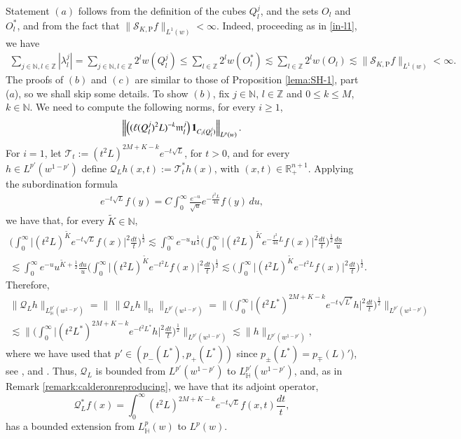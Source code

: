 \documentclass[11pt, a4paper,leqno]{amsart}
\newcommand{\mm}{\mathfrak{m}}
\renewcommand{\chi}{{\bf 1}}
\theoremstyle{plain}
\theoremstyle{definition}
\theoremstyle{remark}
\numberwithin{equation}{section}
\def \R{ \mathbb{R} }
\def \N{ \mathbb{N} }
\def \Z{ \mathbb{Z} }
\def \Scal{ \mathcal{S} }
\def \pp{ \mathrm{P} }
\begin{document}
Statement $(a)$ follows from the definition of the cubes $Q_l^j$, and the sets $O_l$ and $O_l^*$,
 and from the fact that $\|\Scal_{K,\pp}f\|_{L^1(w)}<\infty$. Indeed, proceeding as in \eqref{in-l1}, we have
    \begin{align*}
    \sum_{j\in \N, l\in \Z}|\lambda_l^j|=\sum_{j\in \N, l\in \Z}2^lw(Q_l^j)\leq\sum_{l\in \Z}2^lw(O_l^*)\lesssim\sum_{l\in \Z}2^lw(O_l)
    \lesssim \|\Scal_{K,\pp}f\|_{L^1(w)}<\infty.
    \end{align*}
The proofs of $(b)$ and $(c)$ are similar to those of
Proposition \ref{lema:SH-1}, part ($a$), so we shall skip some details. To show $(b)$,
fix $j\in \N$, $l\in \Z$ and $0\leq k\leq M$, $k\in \N$. We need to compute the
following norms, for every $i\geq 1$,
$$
\left\|\left((\ell(Q_l^j)^2L)^{-k}\mm_l^j\right)\chi_{C_i(Q_l^j)}\right\|_{L^p(w)}.
$$
For $i=1$,  let $\mathcal{T}_t:=(t^2L)^{2M+K-k}e^{-t\sqrt{L}}$, for $t>0$, and for every $h\in L^{p'}(w^{1-p'})$ define $\mathcal{Q}_{L}h(x,t):=\mathcal{T}_t^*h(x)$, with $(x,t)\in \R^{n+1}_+$.
Applying the subordination formula 
\begin{align}\label{FR}
e^{-t\sqrt{L}}f(y)=C\int_0^{\infty}\frac{e^{-u}}{\sqrt{u}}e^{-\frac{t^2L}{4u}}f(y) \, du,
\end{align}
we have that, for every $\widetilde{K}\in \N$,
\begin{multline}\label{controlverticalSK}
\Bigg(\int_0^{\infty}\big|(t^2L)^{\widetilde{K}}e^{-t\sqrt{L}}f(x)\big|^2\frac{dt}{t}\Bigg)^{\frac{1}{2}}
\lesssim
\int_{0}^{\infty}e^{-u}u^{\frac{1}{2}}\Bigg(\int_0^{\infty}\big|(t^2L)^{\widetilde{K}}e^{-\frac{t^2}{4u}L}f(x)\big|^2\frac{dt}{t}\Bigg)^{\frac{1}{2}}\frac{du}{u}
\\
\lesssim
\int_{0}^{\infty}e^{-u}u^{\widetilde{K}+\frac{1}{2}}\frac{du}{u}\Bigg(\int_0^{\infty}\big|(t^2L)^{\widetilde{K}}e^{-t^2L}f(x)\big|^2\frac{dt}{t}\Bigg)^{\frac{1}{2}}
\lesssim 
\Bigg(\int_0^{\infty}\big|(t^2L)^{\widetilde{K}}e^{-t^2L}f(x)\big|^2\frac{dt}{t}\Bigg)^{\frac{1}{2}}.
\end{multline}
Therefore, 
\begin{multline*}
\|\mathcal{Q}_Lh\|_{L^{p'}_{\mathbb{H}}(w^{1-p'})}=
\big\| \,\|\mathcal{Q}_Lh\|_{\mathbb{H}}\big\|_{L^{p'}(w^{1-p'})}
=
\Bigg\| \Bigg(\int_0^{\infty}\big|(t^2L^*)^{2M+K-k}e^{-t\sqrt{L^*}}h\big|^2\frac{dt}{t}\Bigg)^{\frac{1}{2}}\Bigg\|_{L^{p'}(w^{1-p'})}
\\
\lesssim
\Bigg\|\Bigg(\int_0^{\infty}\big|(t^2L^*)^{2M+K-k}e^{-t^2L^*}h\big|^2\frac{dt}{t}\Bigg)^{\frac{1}{2}}
\Bigg\|_{L^{p'}(w^{1-p'})}
\lesssim
\|h\|_{L^{p'}(w^{1-p'})},
\end{multline*} 
where we have used that $p'\in (p_-(L^*),p_+(L^*))$ since $p_{\pm}(L^*)=p_{\mp}(L)'$), see \cite{Auscher}, 
\cite[Lemma 4.4]{AuscherMartell:I} and \cite{AuscherMartell:III}. Thus, $\mathcal{Q}_L$ is bounded from $L^{p'}(w^{1-p'})$ to $L^{p'}_{\mathbb{H}}(w^{1-p'})$, and,  as in Remark \ref{remark:calderonreproducing}, we have that its adjoint operator,
$$
\mathcal{Q}_L^*f(x)=\int_{0}^{\infty} (t^2L)^{2M+K-k}e^{-t\sqrt{L}}
f(x,t)\frac{dt}{t},
$$
has a bounded extension from $L^p_{\mathbb{H}}(w)$ to $L^p(w)$. 
\end{document}
